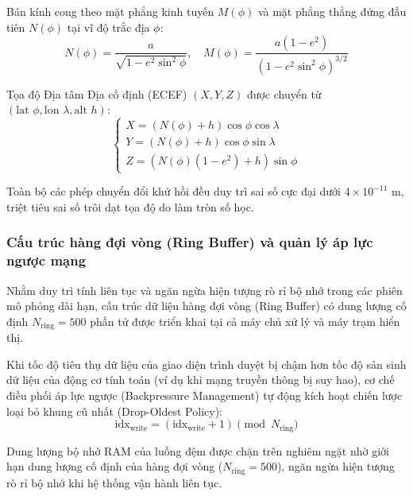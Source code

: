 Bán kính cong theo mặt phẳng kinh tuyến $M(\phi)$ và mặt phẳng thẳng đứng đầu tiên $N(\phi)$ tại vĩ độ trắc địa $\phi$:
\begin{equation}
N(\phi) = \frac{a}{\sqrt{1 - e^2 \sin^2\phi}}, \quad M(\phi) = \frac{a(1 - e^2)}{(1 - e^2 \sin^2\phi)^{3/2}}
\label{eq:geodetic-radii}
\end{equation}

Tọa độ Địa tâm Địa cố định (ECEF) $(X, Y, Z)$ được chuyển từ $( \text{lat } \phi, \text{lon } \lambda, \text{alt } h )$:
\begin{equation}
\begin{cases}
X = (N(\phi) + h) \cos\phi \cos\lambda \\
Y = (N(\phi) + h) \cos\phi \sin\lambda \\
Z = (N(\phi)(1 - e^2) + h) \sin\phi
\end{cases}
\label{eq:lla-to-ecef-full}
\end{equation}

Toàn bộ các phép chuyển đổi khứ hồi đều duy trì sai số cực đại dưới $4 \times 10^{-11}$ m, triệt tiêu sai số trôi dạt tọa độ do làm tròn số học.

\subsubsection{Cấu trúc hàng đợi vòng (Ring Buffer) và quản lý áp lực ngược mạng}

\hspace{0.5cm} Nhằm duy trì tính liên tục và ngăn ngừa hiện tượng rò rỉ bộ nhớ trong các phiên mô phỏng dài hạn, cấu trúc dữ liệu hàng đợi vòng (Ring Buffer) có dung lượng cố định $N_{\text{ring}} = 500$ phần tử được triển khai tại cả máy chủ xử lý và máy trạm hiển thị.

Khi tốc độ tiêu thụ dữ liệu của giao diện trình duyệt bị chậm hơn tốc độ sản sinh dữ liệu của động cơ tính toán (ví dụ khi mạng truyền thông bị suy hao), cơ chế điều phối áp lực ngược (Backpressure Management) tự động kích hoạt chiến lược loại bỏ khung cũ nhất (Drop-Oldest Policy):
\begin{equation}
\text{idx}_{\text{write}} = (\text{idx}_{\text{write}} + 1) \pmod{N_{\text{ring}}}
\label{eq:ring-buffer-write}
\end{equation}

Dung lượng bộ nhớ RAM của luồng đệm được chặn trên nghiêm ngặt nhờ giới hạn dung lượng cố định của hàng đợi vòng ($N_{\text{ring}} = 500$), ngăn ngừa hiện tượng rò rỉ bộ nhớ khi hệ thống vận hành liên tục.

